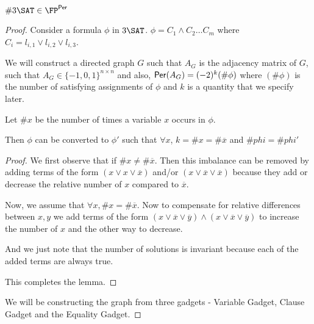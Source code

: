 \begin{theorem}
$\#3\SAT\in \FP^{\per}$
\end{theorem}
\begin{proof}
Consider a formula $\phi $ in $3\SAT$. $\phi = C_1\wedge C_2 \dots C_m$ where $C_i = l_{i,1}\vee l_{i,2} \vee l_{i,3}$.

We will construct a directed graph $G$ such that $A_G$ is the adjacency matrix of $G$, such that $A_G \in \{-1,0,1\}^{n\times n}$ and also, ${\sf Per}(A_G)=(-2)^k(\#\phi)$ where $(\#\phi)$ is the number of satisfying assignments of $\phi$ and $k$ is a quantity that we specify later.

\begin{lemma}
Let $\#x$ be the number of times a variable $x$ occurs in $\phi$. 

Then $\phi$ can be converted to $\phi'$ such that $\forall x$, $k = \#x=\# \overline{x}$ and $\#phi = \# phi'$
\end{lemma}

\begin{proof}
 We first observe that if $\# x \not = \# \overline{x}$. Then this imbalance can be removed by adding terms of the form $(x\vee x\vee \overline{x})$ and/or $(x\vee \overline{x}\vee \overline{x})$ because they add or decrease the relative number of $x$ compared to $\overline{x}$.
 
 Now, we assume that $\forall x, \#x = \# \overline{x}$.
 Now to compensate for relative differences between $x, y$ we add terms of the form $(x\vee \overline{x}\vee \overline{y})\wedge (x\vee \overline{x}\vee \overline{y})$ to increase the number of $x$ and the other way to decrease.
 
 And we just note that the number of solutions is invariant because each of the added terms are always true.
 
 This completes the lemma.
 \end{proof}
  
  We will be constructing the graph from three gadgets - Variable Gadget, Clause Gadget and the Equality Gadget.


\end{proof}
